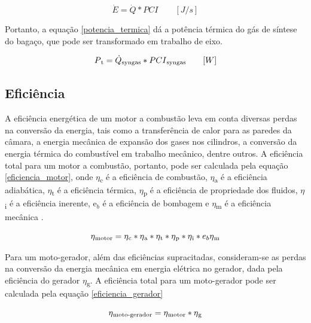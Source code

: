 \begin{equation} \label{consumo_energetico}
\dot{E} = \dot{Q} * PCI   \quad\quad  [J/s]
\end{equation}

Portanto, a equação \ref{potencia_termica} dá a potência térmica do gás de síntese do bagaço, que pode ser transformado em trabalho de eixo.

\begin{equation} \label{potencia_termica}
P\textsubscript{t} = \dot{Q}\textsubscript{syngas} * PCI\textsubscript{syngas} \quad\quad  [W]
\end{equation}

\subsection{Eficiência}

A eficiência energética de um motor a combustão leva em conta diversas perdas na conversão da energia, tais como a transferência de calor para as paredes da câmara,
a energia mecânica de expansão dos gases nos cilindros, a conversão da energia térmica do combustível em trabalho mecânico, dentre outros. A eficiência total para um motor a combustão, portanto, pode ser calculada pela equação \ref{eficiencia_motor}, onde $\eta$\textsubscript{c} é a eficiência de combustão, $\eta$\textsubscript{a} é a eficiência adiabática, $\eta$\textsubscript{t} é a eficiência térmica, $\eta$\textsubscript{p} é a eficiência de propriedade dos fluidos, $\eta$\textsubscript{i} é a eficiência inerente, e$_b$ é a eficiência de bombagem e $\eta$\textsubscript{m} é a eficiência mecânica \cite{martins2006}.

\begin{equation} \label{eficiencia_motor}
\eta\textsubscript{motor} = \eta\textsubscript{c} * \eta\textsubscript{a} * \eta\textsubscript{t} * \eta\textsubscript{p} * \eta\textsubscript{i} * e_b \eta\textsubscript{m} 
\end{equation}

Para um moto-gerador, além das eficiências supracitadas, consideram-se as perdas na conversão da energia mecânica em energia elétrica no gerador, dada pela eficiência do gerador $\eta$\textsubscript{g}. A eficiência total para um moto-gerador pode ser calculada pela equação \ref{eficiencia_gerador}

\begin{equation} \label{eficiencia_gerador}
\eta\textsubscript{moto-gerador} = \eta\textsubscript{motor} * \eta\textsubscript{g}
\end{equation}


